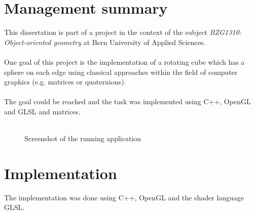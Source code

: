 \documentclass[pdftex,12pt,a4paper]{article}
\begin{document}


\newpage

\section{Management summary}

This dissertation is part of a project in the context of the subject \textit{BZG1310: Object-oriented geometry} at Bern University of Applied Sciences.
\\
\\
One goal of this project is the implementation of a rotating cube which has a sphere on each edge using classical approaches within the field of computer graphics (e.g. matrices or quaternions).
\\
\\
The goal could be reached and the task was implemented using C++, \gls{OpenGL} and \gls{GLSL} and matrices.\\
\\
\begin{figure}[htbp]
\centering {}
\caption{Screenshot of the running application \label{fig:screenshot}}
\end{figure}

\section{Implementation}

The implementation was done using C++, OpenGL and the shader language GLSL.
\end{document}
